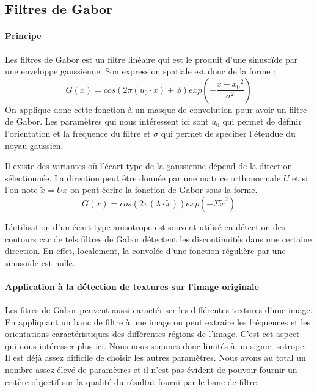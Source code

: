 \documentclass{article}
\begin{document}
\subsection{Filtres de Gabor}

\paragraph{Principe}

Les filtres de Gabor  est un filtre linéaire qui est le produit d'une sinusoïde 
par une enveloppe gaussienne. Son expression spatiale est donc de la forme :
$$ G(x)= cos(2 \pi (u_0 \cdot x) + \phi) exp\left(-\frac{{x-x_0}^2}{\sigma^2}\right) $$
On applique donc cette fonction à un masque de convolution pour avoir un filtre de Gabor.
Les paramètres qui nous intéressent ici sont $u_0$ qui permet de définir l'orientation et la fréquence du filtre et $\sigma$ qui permet de spécifier l'étendue du noyau gaussien. 

Il existe des variantes où l'écart type de la gaussienne dépend de la direction sélectionnée. 
La direction peut être donnée par une matrice orthonormale $U$ et si l'on note $\tilde{x} = U x$ on peut écrire la fonction de Gabor sous la forme.
$$ G(x)= cos(2 \pi (\lambda \cdot \tilde{x}) ) exp\left(- {\Sigma \tilde{x}}^2 \right) $$

L'utilisation d'un écart-type anisotrope est souvent utilisé en détection des contours car de tels filtres de Gabor détectent les discontinuités dans une certaine direction. En effet, localement, la convolée d'une fonction régulière par une sinusoïde est nulle.

\paragraph{Application à la détection de textures sur l'image originale}

Les fitres de Gabor peuvent aussi  caractériser les différentes textures d'une image. En appliquant un banc de filtre à une image on peut extraire les fréquences et les orientations caractéristiques des différentes régions de l'image. C'est cet aspect qui nous intéresser plus ici. Nous nous sommes donc limités à un sigme isotrope. Il est déjà assez difficile de choisir les autres paramètres. Nous avons au total un nombre assez élevé de paramètres et il n'est pas évident de pouvoir fournir un critère objectif sur la qualité du résultat fourni par le banc de filtre.
\end{document}
